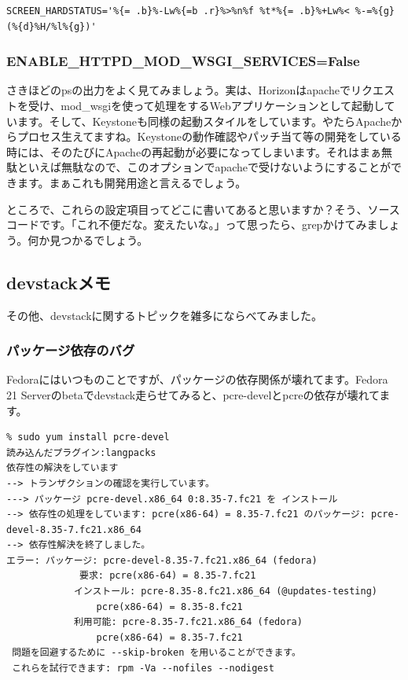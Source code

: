 \documentclass[9pt,b5paper,tombo,openany,dvipdfmx]{jsbook}
\begin{document}
\begin{lstlisting}
SCREEN_HARDSTATUS='%{= .b}%-Lw%{=b .r}%>%n%f %t*%{= .b}%+Lw%< %-=%{g}(%{d}%H/%l%{g})'
\end{lstlisting}

\subsubsection{ENABLE\_HTTPD\_MOD\_WSGI\_SERVICES=False}

さきほどのpsの出力をよく見てみましょう。実は、Horizonはapacheでリクエストを受け、mod\_wsgiを使って処理をするWebアプリケーションとして起動しています。そして、Keystoneも同様の起動スタイルをしています。やたらApacheからプロセス生えてますね。Keystoneの動作確認やパッチ当て等の開発をしている時には、そのたびにApacheの再起動が必要になってしまいます。それはまぁ無駄といえば無駄なので、このオプションでapacheで受けないようにすることができます。まぁこれも開発用途と言えるでしょう。

ところで、これらの設定項目ってどこに書いてあると思いますか？そう、ソースコードです。「これ不便だな。変えたいな。」って思ったら、grepかけてみましょう。何か見つかるでしょう。

\subsection{devstackメモ}

その他、devstackに関するトピックを雑多にならべてみました。

\subsubsection{パッケージ依存のバグ}

Fedoraにはいつものことですが、パッケージの依存関係が壊れてます。Fedora 21 Serverのbetaでdevstack走らせてみると、pcre-develとpcreの依存が壊れてます。

\begin{lstlisting}
% sudo yum install pcre-devel
読み込んだプラグイン:langpacks
依存性の解決をしています
--> トランザクションの確認を実行しています。
---> パッケージ pcre-devel.x86_64 0:8.35-7.fc21 を インストール
--> 依存性の処理をしています: pcre(x86-64) = 8.35-7.fc21 のパッケージ: pcre-devel-8.35-7.fc21.x86_64
--> 依存性解決を終了しました。
エラー: パッケージ: pcre-devel-8.35-7.fc21.x86_64 (fedora)
             要求: pcre(x86-64) = 8.35-7.fc21
            インストール: pcre-8.35-8.fc21.x86_64 (@updates-testing)
                pcre(x86-64) = 8.35-8.fc21
            利用可能: pcre-8.35-7.fc21.x86_64 (fedora)
                pcre(x86-64) = 8.35-7.fc21
 問題を回避するために --skip-broken を用いることができます。
 これらを試行できます: rpm -Va --nofiles --nodigest
\end{lstlisting}
\end{document}

